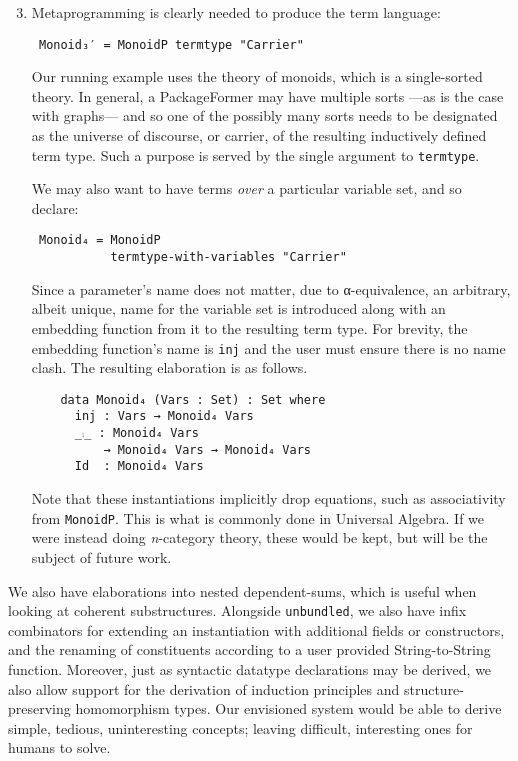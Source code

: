 \documentclass[sigplan,screen]{acmart}
\begin{document}
\begin{enumerate}
\setcounter{enumi}{2}
\item Metaprogramming is clearly needed to produce the term language:
\vspace{0.3em}
\begin{verbatim}
 Monoid₃′ = MonoidP termtype "Carrier"
\end{verbatim}
\vspace{0.3em}
\noindent
Our running example uses the theory of monoids, which is a single-sorted theory.
In general, a PackageFormer may have multiple sorts ---as is the case with
graphs--- and so one of the possibly many sorts needs to be designated as the
universe of discourse, or carrier, of the resulting inductively defined term type.
Such a purpose is served by the single argument to \texttt{termtype}.

\vspace{0.3em}
\noindent
We may also want to have terms \emph{over} a particular variable set, and so declare:
\vspace{0.3em}
\begin{verbatim}
 Monoid₄ = MonoidP
           termtype-with-variables "Carrier"
\end{verbatim}
\vspace{0.3em}
\noindent
Since a parameter's name does not matter, due to α-equivalence, an arbitrary,
albeit unique, name for the variable set is introduced along with an embedding
function from it to the resulting term type. For brevity, the embedding function's
name is \texttt{inj} and the user must ensure there is no name clash.
The resulting elaboration is as follows.
\vspace{0.3em}
\noindent
\begin{verbatim}
    data Monoid₄ (Vars : Set) : Set where
      inj : Vars → Monoid₄ Vars
      _⨾_ : Monoid₄ Vars
          → Monoid₄ Vars → Monoid₄ Vars
      Id  : Monoid₄ Vars
\end{verbatim}

\vspace{0.3em}
\noindent
Note that these instantiations implicitly drop equations, such
as associativity from \texttt{MonoidP}.  This is what is commonly done
in Universal Algebra. If we were instead doing \emph{n}-category
theory, these would be kept, but will be the subject of future
work.
\end{enumerate}

We also have elaborations into nested dependent-sums, which is useful
when looking at coherent substructures.
Alongside \texttt{unbundled}, we also have infix combinators for extending an
instantiation with additional fields or constructors, and the renaming of constituents
according to a user provided String-to-String function.
Moreover, just as syntactic datatype declarations may be derived, we also
allow support for the derivation of induction principles and structure-preserving homomorphism types.
Our envisioned system would be able to derive simple, tedious, uninteresting concepts; leaving difficult,
interesting ones for humans to solve.
\end{document}
